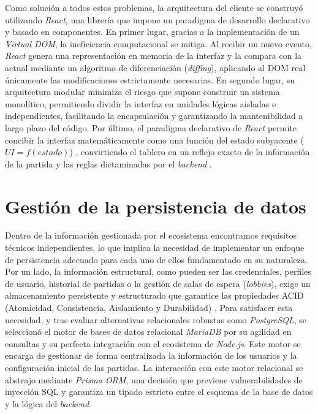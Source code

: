 Como solución a todos estos problemas, la arquitectura del cliente se construyó utilizando \textit{React}, una librería que impone un paradigma de desarrollo declarativo y basado en componentes. En primer lugar, gracias a la implementación de un \textit{Virtual DOM}, la ineficiencia computacional se mitiga. Al recibir un nuevo evento, \textit{React} genera una representación en memoria de la interfaz y la compara con la actual mediante un algoritmo de diferenciación (\textit{diffing}), aplicando al DOM real únicamente las modificaciones estrictamente necesarias. En segundo lugar, su arquitectura modular minimiza el riesgo que supone construir un sistema monolítico, permitiendo dividir la interfaz en unidades lógicas aisladas e independientes, facilitando la encapsulación y garantizando la mantenibilidad a largo plazo del código. Por último, el paradigma declarativo de \textit{React} permite concibir la interfaz matemáticamente como una función del estado subyacente ($UI = f(estado)$) \cite{banks_react}, convirtiendo el tablero en un reflejo exacto de la información de la partida y las reglas dictaminadas por el \textit{backend} \cite{mardan_react}.

\section{Gestión de la persistencia de datos}

Dentro de la información gestionada por el ecosistema encontramos requisitos técnicos independientes, lo que implica la necesidad de implementar un enfoque de persistencia adecuado para cada uno de ellos fundamentado en su naturaleza. Por un lado, la información estructural, como pueden ser las credenciales, perfiles de usuario, historial de partidas o la gestión de salas de espera (\textit{lobbies}), exige un almacenamiento persistente y estructurado que garantice las propiedades ACID (Atomicidad, Consistencia, Aislamiento y Durabilidad) \cite{elmasri_db}. Para satisfacer esta necesidad, y tras evaluar alternativas relacionales robustas como \textit{PostgreSQL}, se seleccionó el motor de bases de datos relacional \textit{MariaDB} por su agilidad en consultas y su perfecta integración con el ecosistema de \textit{Node.js}. Este motor se encarga de gestionar de forma centralizada la información de los usuarios y la configuración inicial de las partidas. La interacción con este motor relacional se abstrajo mediante \textit{Prisma ORM}, una decisión que previene vulnerabilidades de inyección SQL y garantiza un tipado estricto entre el esquema de la base de datos y la lógica del \textit{backend}.

